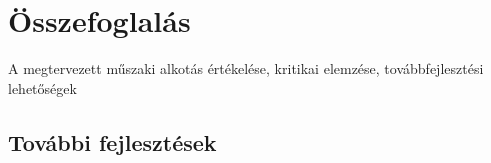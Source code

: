 \chapter*{Összefoglalás}

A megtervezett műszaki alkotás értékelése, kritikai elemzése, továbbfejlesztési lehetőségek

\section*{További fejlesztések}